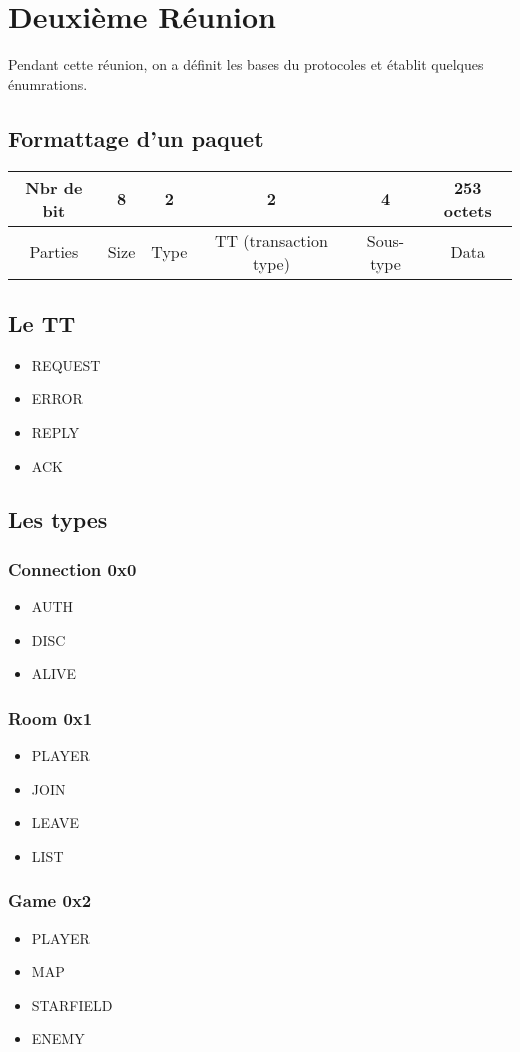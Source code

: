 \documentclass{article}
\begin{document}
\section{Deuxième Réunion}
Pendant cette réunion, on a définit les bases du protocoles et établit quelques
énumrations.
\subsection{Formattage d'un paquet}
\begin{tabular}{| c | c | c | c | c | c |}
  \hline
  Nbr de bit & 8 & 2 & 2 & 4 & 253 octets \\ \hline
  Parties & Size & Type & TT (transaction type) & Sous-type & Data \\ \hline
\end{tabular}
\subsection{Le TT}
\begin{itemize}
  \item{REQUEST}
  \item{ERROR}
  \item{REPLY}
  \item{ACK}
\end{itemize}
\subsection{Les types}
\subsubsection{Connection 0x0}
\begin{itemize}
  \item{AUTH}
  \item{DISC}
  \item{ALIVE}
\end{itemize}
\subsubsection{Room 0x1}
\begin{itemize}
  \item{PLAYER}
  \item{JOIN}
  \item{LEAVE}
  \item{LIST}
\end{itemize}
\subsubsection{Game 0x2}
\begin{itemize}
  \item{PLAYER}
  \item{MAP}
  \item{STARFIELD}
  \item{ENEMY}
\end{itemize}
\end{document}
